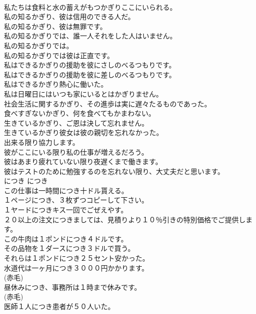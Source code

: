 \documentclass[8pt]{extreport}
\begin{document}
\begin{CJK}{UTF8}{min}
\\	私たちは食料と水の蓄えがもつかぎりここにいられる。   
\\	私の知るかぎり、彼は信用のできる人だ。   
\\	私の知るかぎり、彼は無罪です。   
\\	私の知るかぎりでは、誰一人それをした人はいません。   
\\	私の知るかぎりでは。   
\\	私の知るかぎりでは彼は正直です。   
\\	私はできるかぎりの援助を彼にさしのべるつもりです。   
\\	私はできるかぎりの援助を彼に差しのべるつもりです。   
\\	私はできるかぎり熱心に働いた。   
\\	私は日曜日にはいつも家にいるとはかぎりません。   
\\	社会生活に関するかぎり、その進歩は実に遅々たるものであった。   
\\	食べすぎないかぎり、何を食べてもかまわない。   
\\	生きているかぎり、ご恩は決して忘れません。   
\\	生きているかぎり彼女は彼の親切を忘れなかった。   
\\	出来る限り協力します。  
\\	彼がここにいる限り私の仕事が増えるだろう。  
\\	彼はあまり疲れていない限り夜遅くまで働きます。   
\\	彼はテストのために勉強するのを忘れない限り、大丈夫だと思います。  
\\	につき	につき	
\\	この仕事は一時間につき十ドル貰える。  
\\	１ページにつき、３枚ずつコピーして下さい。   
\\	１ヤードにつきキス一回でごぜえやす。   
\\	２０以上の注文につきましては、見積りより１０％引きの特別価格でご提供します。   
\\	この牛肉は１ポンドにつき４ドルです。   
\\	その品物を１ダースにつき３ドルで買う。   
\\	それらは１ポンドにつき２５セント安かった。   
\\	水道代は一ヶ月につき３０００円かかります。  
\\	(赤毛)
\\	昼休みにつき、事務所は１時まで休みです。  
\\	(赤毛)
\\	医師１人につき患者が５０人いた。   

\end{CJK}
\end{document}
